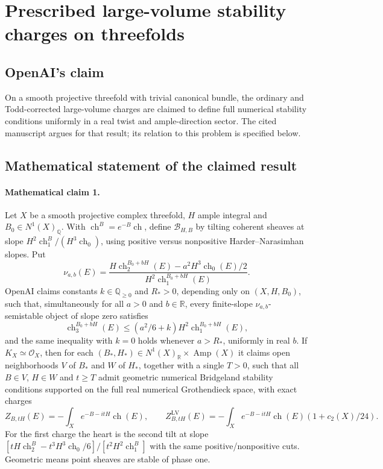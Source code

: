 \documentclass[11pt]{article}
\begin{document}
\section*{Prescribed large-volume stability charges on threefolds}

\subsection{OpenAI's claim}
On a smooth projective threefold with trivial canonical bundle, the ordinary and Todd-corrected large-volume charges are claimed to define full numerical stability conditions uniformly in a real twist and ample-direction sector. The cited manuscript argues for that result; its relation to this problem is specified below.

\subsection{Mathematical statement of the claimed result}
\paragraph{Mathematical claim 1.} Let $X$ be a smooth projective complex threefold, $H$ ample integral and $B_0\in N^1(X)_{\mathbb Q}$. With $\operatorname{ch}^B=e^{-B}\operatorname{ch}$, define $\mathcal B_{H,B}$ by tilting coherent sheaves at slope $H^2\operatorname{ch}_1^B/(H^3\operatorname{ch}_0)$, using positive versus nonpositive Harder--Narasimhan slopes. Put
\[
\nu_{a,b}(E)=\frac{H\operatorname{ch}_2^{B_0+bH}(E)-a^2H^3\operatorname{ch}_0(E)/2}{H^2\operatorname{ch}_1^{B_0+bH}(E)}.
\]
OpenAI claims constants $k\in\mathbb Q_{\ge0}$ and $R_*>0$, depending only on $(X,H,B_0)$, such that, simultaneously for all $a>0$ and $b\in\mathbb R$, every finite-slope $\nu_{a,b}$-semistable object of slope zero satisfies
\[
\operatorname{ch}_3^{B_0+bH}(E)\le(a^2/6+k)H^2\operatorname{ch}_1^{B_0+bH}(E),
\]
and the same inequality with $k=0$ holds whenever $a>R_*$, uniformly in real $b$.
If $K_X\simeq\mathcal O_X$, then for each $(B_*,H_*)\in N^1(X)_{\mathbb R}\times\operatorname{Amp}(X)$ it claims open neighborhoods $V$ of $B_*$ and $W$ of $H_*$, together with a single $T>0$, such that all $B\in V$, $H\in W$ and $t\ge T$ admit geometric numerical Bridgeland stability conditions supported on the full real numerical Grothendieck space, with exact charges
\[
Z_{B,tH}(E)=-\int_Xe^{-B-itH}\operatorname{ch}(E),\qquad
Z^{\mathrm{LV}}_{B,tH}(E)=-\int_Xe^{-B-itH}\operatorname{ch}(E)(1+c_2(X)/24).
\]
For the first charge the heart is the second tilt at slope $[tH\operatorname{ch}_2^B-t^3H^3\operatorname{ch}_0/6]/[t^2H^2\operatorname{ch}_1^B]$ with the same positive/nonpositive cuts. Geometric means point sheaves are stable of phase one.
\end{document}
